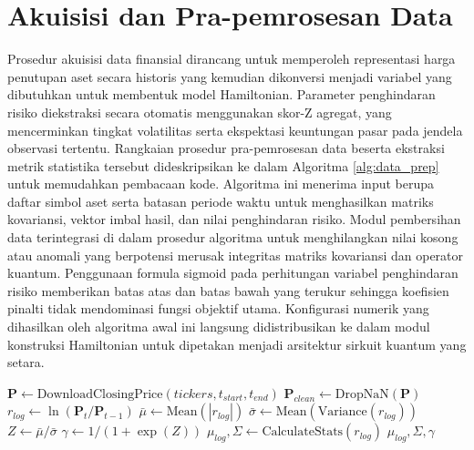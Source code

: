 \section{Akuisisi dan Pra-pemrosesan Data}
Prosedur akuisisi data finansial dirancang untuk memperoleh representasi harga penutupan aset secara historis yang kemudian dikonversi menjadi variabel yang dibutuhkan untuk membentuk model Hamiltonian. Parameter penghindaran risiko diekstraksi secara otomatis menggunakan skor-Z agregat, yang mencerminkan tingkat volatilitas serta ekspektasi keuntungan pasar pada jendela observasi tertentu. Rangkaian prosedur pra-pemrosesan data beserta ekstraksi metrik statistika tersebut dideskripsikan ke dalam Algoritma \ref{alg:data_prep} untuk memudahkan pembacaan kode. Algoritma ini menerima input berupa daftar simbol aset serta batasan periode waktu untuk menghasilkan matriks kovariansi, vektor imbal hasil, dan nilai penghindaran risiko. Modul pembersihan data terintegrasi di dalam prosedur algoritma untuk menghilangkan nilai kosong atau anomali yang berpotensi merusak integritas matriks kovariansi dan operator kuantum. Penggunaan formula sigmoid pada perhitungan variabel penghindaran risiko memberikan batas atas dan batas bawah yang terukur sehingga koefisien pinalti tidak mendominasi fungsi objektif utama. Konfigurasi numerik yang dihasilkan oleh algoritma awal ini langsung didistribusikan ke dalam modul konstruksi Hamiltonian untuk dipetakan menjadi arsitektur sirkuit kuantum yang setara.

\begin{algorithm}[ht]
\caption{Akuisisi dan Pra-pemrosesan Data Finansial}
\label{alg:data_prep}
\begin{algorithmic}[1]
    \State $\mathbf{P} \gets \text{DownloadClosingPrice}(tickers, t_{start}, t_{end})$
    \State $\mathbf{P}_{clean} \gets \text{DropNaN}(\mathbf{P})$
    \State $r_{log} \gets \ln(\mathbf{P}_{t} / \mathbf{P}_{t-1})$
    \State $\bar{\mu} \gets \text{Mean}(|r_{log}|)$
    \State $\bar{\sigma} \gets \text{Mean}(\text{Variance}(r_{log}))$
    \State $Z \gets \bar{\mu} / \bar{\sigma}$ 
    \State $\gamma \gets 1 / (1 + \exp(Z))$ 
    \State $\mu_{log}, \Sigma \gets \text{CalculateStats}(r_{log})$
    \State \Return $\mu_{log}, \Sigma, \gamma$
\EndProcedure
\end{algorithmic}
\end{algorithm}